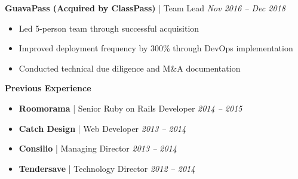 \documentclass[letterpaper,10pt]{article}
\begin{document}
\textbf{GuavaPass (Acquired by ClassPass)} | Team Lead \hfill \textit{Nov 2016 -- Dec 2018}
\begin{itemize}[leftmargin=*, nosep]
    \item Led 5-person team through successful acquisition
    \item Improved deployment frequency by 300\% through DevOps implementation
    \item Conducted technical due diligence and M\&A documentation
\end{itemize}

\textbf{Previous Experience}
\begin{itemize}[leftmargin=*, nosep]
    \item \textbf{Roomorama} | Senior Ruby on Rails Developer \hfill \textit{2014 -- 2015}
    \item \textbf{Catch Design} | Web Developer \hfill \textit{2013 -- 2014}
    \item \textbf{Consilio} | Managing Director \hfill \textit{2013 -- 2014}
    \item \textbf{Tendersave} | Technology Director \hfill \textit{2012 -- 2014}
\end{itemize}
\end{document}

